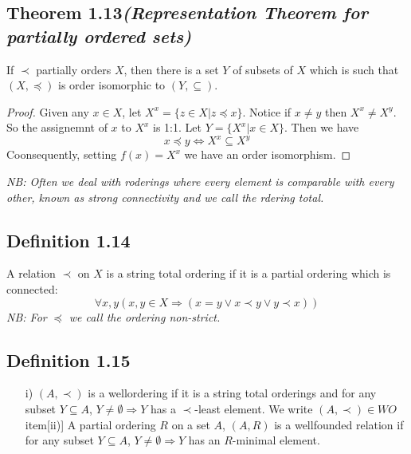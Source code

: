 \documentclass[a4paper, 12pt, twoside]{article}
\begin{document}
\subsection*{Theorem 1.13\textit{(Representation Theorem for partially ordered sets)}}
If $\prec$ partially orders $X$, then there is a set $Y$ of subsets of $X$ which is such that $(X,\preceq)$ is order isomorphic to $(Y,\subseteq)$.
\begin{proof}
    Given any $x\in X$, let $X^{x} = \{z\in X|z\preceq x\}$. Notice if $x\neq y$ then $X^{x}\neq X^{y}$. So the assignemnt of $x$ to $X^{x}$ is 1:1. Let $Y = \{X^{x}|x\in X\}$. Then we have
    $$x\preceq y \iff X^{x}\subseteq X^{y} $$
    Coonsequently, setting $f(x)=X^{x}$ we have an order isomorphism.
\end{proof}
\textit{NB: Often we deal with roderings where every element is  comparable with every other, known as \emph{strong connectivity} and we call the rdering \emph{total}.}
\subsection*{Definition 1.14}
A relation $\prec$ on $X$ is a string total ordering if it is a partial ordering which is connected:
$$\forall x,y (x,y\in X\Rightarrow (x=y\vee x\prec y\vee y\prec x)) $$
\textit{NB: For $\preceq$ we call the ordering non-strict.}
\subsection*{Definition 1.15}
\begin{itemize}
    \item[i)]$(A,\prec)$ is a wellordering if it is a string total orderings and for any subset $Y\subseteq A$, $Y\neq \emptyset\Rightarrow Y$ has a $\prec$-least element. We write $(A,\prec)\in WO$
    item[ii)] A partial ordering $R$ on a set $A$, $(A,R)$ is a wellfounded relation if for any subset $Y\subseteq A$, $Y\neq \emptyset\Rightarrow Y$ has an $R$-minimal element.
\end{itemize}
\end{document}
